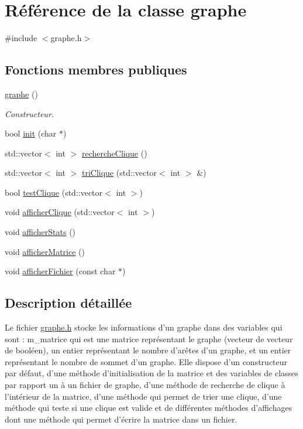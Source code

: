 \hypertarget{classgraphe}{\section{Référence de la classe graphe}
\label{classgraphe}
}


{\ttfamily \#include $<$graphe.\-h$>$}

\subsection*{Fonctions membres publiques}
\begin{DoxyCompactItemize}
\item 
\hyperlink{classgraphe_ae6d92ab361768080763736fc8c8438be}{graphe} ()
\begin{DoxyCompactList}\small\item\em Constructeur. \end{DoxyCompactList}\item 
bool \hyperlink{classgraphe_ac91fe8cf18cc77844cc6faf0b1dbd18b}{init} (char $\ast$)
\item 
std\-::vector$<$ int $>$ \hyperlink{classgraphe_ab1c1f8ecfe46e4add52e3cef7d3c958d}{recherche\-Clique} ()
\item 
std\-::vector$<$ int $>$ \hyperlink{classgraphe_a1aaae2944a27ab98a1cf49b3b65040e9}{tri\-Clique} (std\-::vector$<$ int $>$ \&)
\item 
bool \hyperlink{classgraphe_aa36c03e06eee1acf8cf4b9645efc761f}{test\-Clique} (std\-::vector$<$ int $>$)
\item 
void \hyperlink{classgraphe_a4946eb7fcf22eaf7ec454c08f667fb0d}{afficher\-Clique} (std\-::vector$<$ int $>$)
\item 
void \hyperlink{classgraphe_a66cf25511eda926679caec3fc81f5e73}{afficher\-Stats} ()
\item 
void \hyperlink{classgraphe_a72db045eb880c11a72e166180d778b22}{afficher\-Matrice} ()
\item 
void \hyperlink{classgraphe_aa7ce96d55300c72288216d46911be7d1}{afficher\-Fichier} (const char $\ast$)
\end{DoxyCompactItemize}


\subsection{Description détaillée}
Le fichier \hyperlink{graphe_8h}{graphe.\-h} stocke les informations d'un graphe dans des variables qui sont \-: m\-\_\-matrice qui est une matrice représentant le graphe (vecteur de vecteur de booléen), un entier représentant le nombre d'arêtes d'un graphe, et un entier représentant le nombre de sommet d'un graphe. Elle dispose d'un constructeur par défaut, d'une méthode d'initialisation de la matrice et des variables de classes par rapport un à un fichier de graphe, d'une méthode de recherche de clique à l'intérieur de la matrice, d'une méthode qui permet de trier une clique, d'une méthode qui teste si une clique est valide et de différentes méthodes d'affichages dont une méthode qui permet d'écrire la matrice dans un fichier. 

